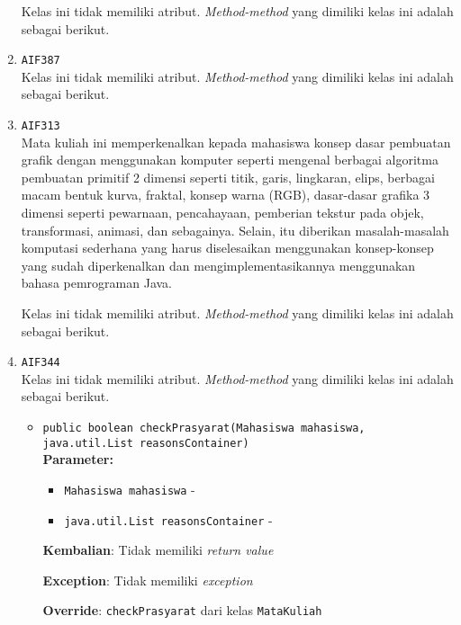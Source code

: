 \documentclass{article}
\begin{document}
\begin{enumerate}
Kelas ini tidak memiliki atribut. \textit{Method-method} yang dimiliki kelas ini adalah sebagai berikut.
\begin{itemize}
\end{itemize}
\item \texttt{AIF387}\\ 
Kelas ini tidak memiliki atribut. \textit{Method-method} yang dimiliki kelas ini adalah sebagai berikut.
\begin{itemize}
\end{itemize}
\item \texttt{AIF313}\\ 
Mata kuliah ini memperkenalkan kepada mahasiswa konsep dasar pembuatan grafik
 dengan menggunakan komputer seperti mengenal berbagai algoritma pembuatan
 primitif 2 dimensi seperti titik, garis, lingkaran, elips, berbagai macam
 bentuk kurva, fraktal, konsep warna (RGB), dasar-dasar grafika 3 dimensi
 seperti pewarnaan, pencahayaan, pemberian tekstur pada objek, transformasi,
 animasi, dan sebagainya. Selain, itu diberikan masalah-masalah komputasi
 sederhana yang harus diselesaikan menggunakan konsep-konsep yang sudah
 diperkenalkan dan mengimplementasikannya menggunakan bahasa pemrograman Java.

Kelas ini tidak memiliki atribut. \textit{Method-method} yang dimiliki kelas ini adalah sebagai berikut.
\begin{itemize}
\end{itemize}
\item \texttt{AIF344}\\ 
Kelas ini tidak memiliki atribut. \textit{Method-method} yang dimiliki kelas ini adalah sebagai berikut.
\begin{itemize}
\item \texttt{public boolean checkPrasyarat(Mahasiswa mahasiswa, java.util.List reasonsContainer)}\\ 


\textbf{Parameter:}\begin{itemize}
\item \texttt{Mahasiswa mahasiswa} - 
\item \texttt{java.util.List reasonsContainer} - 
\end{itemize}
\textbf{Kembalian}: Tidak memiliki \textit{return value}

\textbf{Exception}: Tidak memiliki \textit{exception}

\textbf{Override}: \texttt{checkPrasyarat} dari kelas \texttt{MataKuliah}


\end{itemize}
\end{enumerate}
\end{document}
